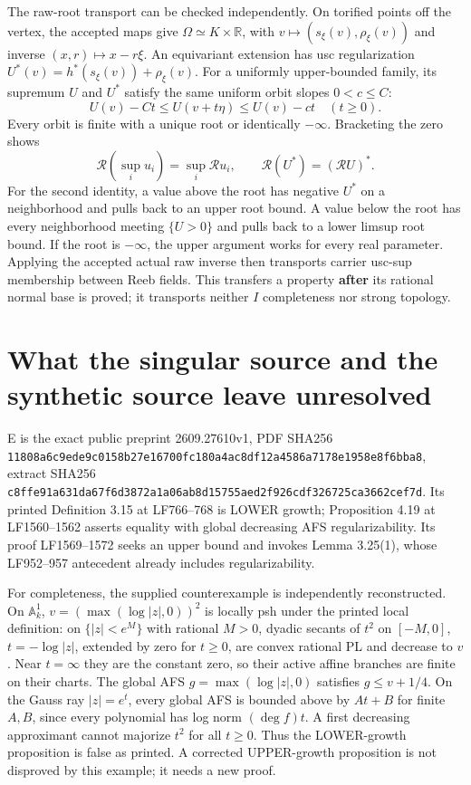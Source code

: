 \documentclass[
  10pt,
]{article}
\begin{document}
The raw-root transport can be checked independently. On torified points
off the vertex, the accepted maps give
\(\Omega\simeq K\times\mathbb R\), with
\(v\mapsto(s_\xi(v),\rho_\xi(v))\) and inverse \((x,r)\mapsto x-r\xi\).
An equivariant extension has usc regularization
\(U^*(v)=h^*(s_\xi(v))+\rho_\xi(v)\). For a uniformly upper-bounded
family, its supremum \(U\) and \(U^*\) satisfy the same uniform orbit
slopes \(0<c\le C\): \[U(v)-Ct\le U(v+t\eta)\le U(v)-ct\quad(t\ge0).\]
Every orbit is finite with a unique root or identically \(-\infty\).
Bracketing the zero shows
\[\mathcal R(\sup_i u_i)=\sup_i\mathcal R u_i,\qquad
 \mathcal R(U^*)=(\mathcal R U)^*. \tag{46}\] For the second identity, a
value above the root has negative \(U^*\) on a neighborhood and pulls
back to an upper root bound. A value below the root has every
neighborhood meeting \(\{U>0\}\) and pulls back to a lower limsup root
bound. If the root is \(-\infty\), the upper argument works for every
real parameter. Applying the accepted actual raw inverse then transports
carrier usc-sup membership between Reeb fields. This transfers a
property \textbf{after} its rational normal base is proved; it
transports neither \(I\) completeness nor strong topology.

\section{What the singular source and the synthetic source leave
unresolved}\label{what-the-singular-source-and-the-synthetic-source-leave-unresolved}

E is the exact public preprint 2609.27610v1, PDF SHA256
\texttt{11808a6c9ede9c0158b27e16700fc180a4ac8df12a4586a7178e1958e8f6bba8},
extract SHA256
\texttt{c8ffe91a631da67f6d3872a1a06ab8d15755aed2f926cdf326725ca3662cef7d}.
Its printed Definition 3.15 at LF766--768 is LOWER growth; Proposition
4.19 at LF1560--1562 asserts equality with global decreasing AFS
regularizability. Its proof LF1569--1572 seeks an upper bound and
invokes Lemma 3.25(1), whose LF952--957 antecedent already includes
regularizability.

For completeness, the supplied counterexample is independently
reconstructed. On \(\mathbb A^1_k\), \(v=(\max(\log|z|,0))^2\) is
locally psh under the printed local definition: on \(\{|z|<e^M\}\) with
rational \(M>0\), dyadic secants of \(t^2\) on \([-M,0]\),
\(t=-\log|z|\), extended by zero for \(t\ge0\), are convex rational PL
and decrease to \(v\). Near \(t=\infty\) they are the constant zero, so
their active affine branches are finite on their charts. The global AFS
\(g=\max(\log|z|,0)\) satisfies \(g\le v+1/4\). On the Gauss ray
\(|z|=e^t\), every global AFS is bounded above by \(At+B\) for finite
\(A,B\), since every polynomial has log norm \((\deg f)t\). A first
decreasing approximant cannot majorize \(t^2\) for all \(t\ge0\). Thus
the LOWER-growth proposition is false as printed. A corrected
UPPER-growth proposition is not disproved by this example; it needs a
new proof.
\end{document}
